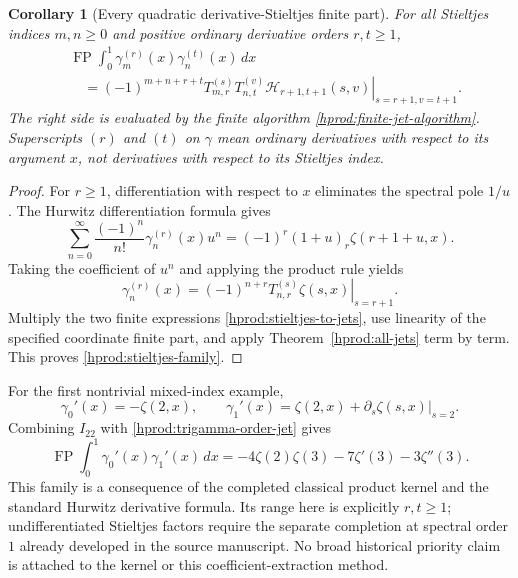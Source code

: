 \documentclass[11pt,a4paper]{article}
\numberwithin{equation}{section}
\newtheorem{corollary}[theorem]{Corollary}
\theoremstyle{definition}
\theoremstyle{remark}
\begin{document}
\begin{corollary}[Every quadratic derivative-Stieltjes finite part]
\label{hprod:stieltjes-products}
For all Stieltjes indices $m,n\ge0$ and positive ordinary derivative
orders $r,t\ge1$,
\begin{equation}\label{hprod:stieltjes-family}
 \begin{split}
 &\operatorname{FP}\int_0^1
       \gamma_m^{(r)}(x)\gamma_n^{(t)}(x)\,dx\\
 &\quad=(-1)^{m+n+r+t}
 \left.T_{m,r}^{(s)}T_{n,t}^{(v)}
       \mathscr H_{r+1,t+1}(s,v)\right|_{s=r+1,v=t+1}.
 \end{split}
\end{equation}
The right side is evaluated by the finite algorithm
\eqref{hprod:finite-jet-algorithm}.  Superscripts $(r)$ and $(t)$
on $\gamma$ mean ordinary derivatives with respect to its argument
$x$, not derivatives with respect to its Stieltjes index.
\end{corollary}

\begin{proof}
For $r\ge1$, differentiation with respect to $x$ eliminates the
spectral pole $1/u$.  The Hurwitz differentiation formula gives
\[
 \sum_{n=0}^{\infty}\frac{(-1)^n}{n!}
       \gamma_n^{(r)}(x)u^n
 =(-1)^r(1+u)_r\zeta(r+1+u,x).
\]
Taking the coefficient of $u^n$ and applying the product rule yields
\begin{equation}\label{hprod:stieltjes-to-jets}
 \gamma_n^{(r)}(x)=(-1)^{n+r}
 \left.T_{n,r}^{(s)}\zeta(s,x)\right|_{s=r+1}.
\end{equation}
Multiply the two finite expressions
\eqref{hprod:stieltjes-to-jets}, use linearity of the specified
coordinate finite part, and apply Theorem~\ref{hprod:all-jets}
term by term.  This proves \eqref{hprod:stieltjes-family}.
\end{proof}

For the first nontrivial mixed-index example,
\[
 \gamma_0'(x)=-\zeta(2,x),\qquad
 \gamma_1'(x)=\zeta(2,x)+
       \left.\partial_s\zeta(s,x)\right|_{s=2}.
\]
Combining $I_{22}$ with \eqref{hprod:trigamma-order-jet} gives
\begin{equation}\label{hprod:stieltjes-first-example}
 \boxed{\operatorname{FP}\int_0^1
         \gamma_0'(x)\gamma_1'(x)\,dx
 =-4\zeta(2)\zeta(3)-7\zeta'(3)-3\zeta''(3).}
\end{equation}
This family is a consequence of the completed classical product kernel
and the standard Hurwitz derivative formula.  Its range here is
explicitly $r,t\ge1$; undifferentiated Stieltjes factors require the
separate completion at spectral order $1$ already developed in the
source manuscript.  No broad historical priority claim is attached to
the kernel or this coefficient-extraction method.
\end{document}

